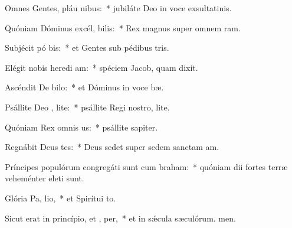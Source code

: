 \item Omnes Gentes, pláu nibus:~* jubiláte Deo in voce exsultatinis.
\item Quóniam Dóminus excél, bilis:~* Rex magnus super omnem ram.
\item Subjécit pó bis:~* et Gentes sub pédibus tris.
\item Elégit nobis heredi am:~* spéciem Jacob, quam dixit.
\item Ascéndit De  bilo:~* et Dóminus in voce bæ.
\item Psállite Deo , lite:~* psállite Regi nostro, lite.
\item Quóniam Rex omnis  us:~* psállite sapiter.
\item Regnábit Deus  tes:~* Deus sedet super sedem sanctam am.
\item Príncipes populórum congregáti sunt cum  braham:~* quóniam dii fortes terræ veheménter eleti sunt.
\item Glória Pa,  lio,~* et Spirítui to.
\item Sicut erat in princípio, et ,  per,~* et in sǽcula sæculórum. men.
